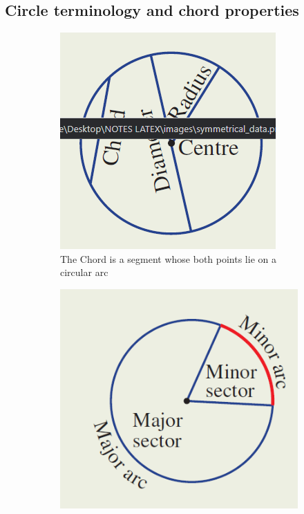 \documentclass{report}
\begin{document}
\subsection{Circle terminology and chord properties}
\begin{figure}
    \centering
    \begin{subfigure}[b]{0.3\textwidth}
        \centering
        \includegraphics[width=\textwidth]{chord.png}
        \caption{The Chord is a segment whose both points lie on a circular arc}
        \label{Chord}
    \end{subfigure}
    \hfill
    \begin{subfigure}[b]{0.3\textwidth}
        \centering
        \includegraphics[width=\textwidth]{arc.png}

\end{subfigure}
\end{figure}
\end{document}
